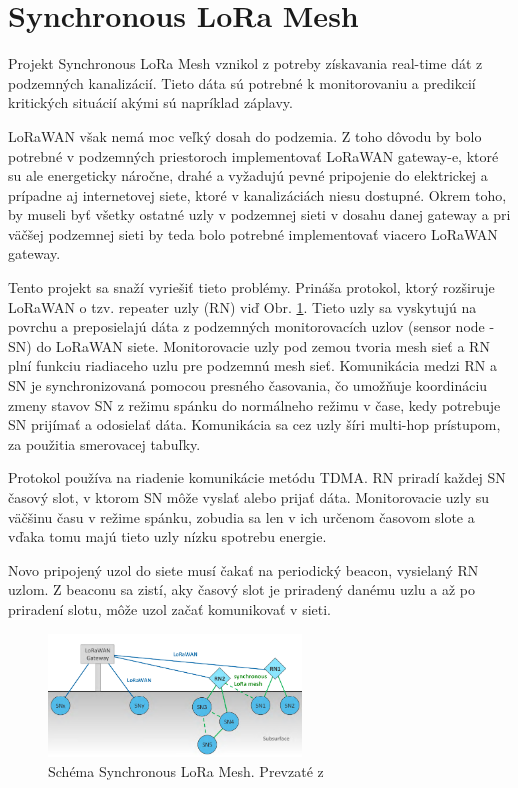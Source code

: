 \documentclass[slovak,master]{diploma}
\begin{document}
\section{Synchronous LoRa Mesh}
Projekt Synchronous LoRa Mesh \cite{synchronouslorameshnetwork} vznikol z potreby získavania real-time dát z podzemných kanalizácií. Tieto dáta sú potrebné k monitorovaniu a predikcií kritických situácií akými 
sú napríklad záplavy.

LoRaWAN však nemá moc veľký dosah do podzemia. Z toho dôvodu by bolo potrebné v podzemných priestoroch implementovať LoRaWAN gateway-e, ktoré su ale energeticky náročne, drahé a vyžadujú 
pevné pripojenie do elektrickej a prípadne aj internetovej siete, ktoré v kanalizáciách niesu dostupné. Okrem toho, by museli byť všetky ostatné uzly v podzemnej sieti v dosahu danej gateway a pri väčšej podzemnej sieti 
by teda bolo potrebné implementovať viacero LoRaWAN gateway.

Tento projekt sa snaží vyriešiť tieto problémy. Prináša protokol, ktorý rozširuje LoRaWAN o tzv. repeater uzly (RN) viď Obr. \ref{fig:synchronouslora}. Tieto uzly sa vyskytujú na povrchu a preposielajú dáta z 
podzemných monitorovacích uzlov (sensor node  - SN) do LoRaWAN siete. Monitorovacie uzly pod zemou tvoria mesh sieť a RN plní funkciu riadiaceho uzlu pre podzemnú mesh sieť. 
Komunikácia medzi RN a SN je synchronizovaná pomocou presného časovania, čo umožňuje koordináciu zmeny stavov SN z režimu spánku do normálneho režimu v čase, kedy 
potrebuje SN prijímať a odosielať dáta. Komunikácia sa cez uzly šíri multi-hop prístupom, za použitia smerovacej tabuľky.

Protokol používa na riadenie komunikácie metódu TDMA. RN priradí každej SN časový slot, v ktorom SN môže vyslať alebo prijať dáta.
Monitorovacie uzly su väčšinu času v režime spánku, zobudia sa len v ich určenom časovom slote a vďaka tomu majú tieto uzly nízku spotrebu energie.

Novo pripojený uzol do siete musí čakať na periodický beacon, vysielaný RN uzlom. Z beaconu sa zistí, aky časový slot je priradený danému uzlu a až po priradení slotu, môže uzol začať komunikovať v sieti.

\begin{figure}
	\centering
	\includegraphics[width=0.6\textwidth]{Figures/synchronouslorameshnetwork.png}
	\caption{Schéma Synchronous LoRa Mesh. Prevzaté z \cite{synchronouslorameshnetwork}}
	\label{fig:synchronouslora}
\end{figure}
\end{document}

